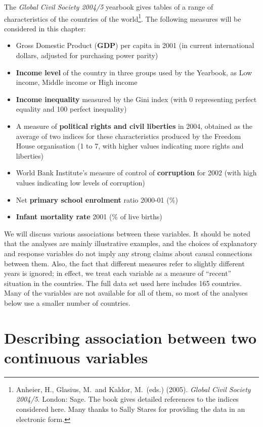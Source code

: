 The \emph{Global Civil Society 2004/5} yearbook gives tables of a range
of characteristics of the countries of the world\footnote { Anheier, H.,
Glasius, M.\ and Kaldor, M.\ (eds.) (2005). \emph{Global Civil Society
2004/5}. London: Sage. The book gives detailed references to the
indices considered here. Many thanks to Sally Stares for providing the
data in an electronic form.}. The following measures will be considered
in this chapter:
\begin{itemize}
\item
Gross Domestic Product (\textbf{GDP}) per capita in 2001
(in current international dollars,
adjusted for purchasing power parity)
\item
\textbf{Income level} of the country
in three groups used by the Yearbook, as
Low income, Middle income or High income
\item
\textbf{Income inequality} measured by the Gini index (with 0
representing perfect equality and 100 perfect inequality)
\item
A measure of \textbf{political rights and civil liberties} in 2004, obtained as
the average of two indices for these characteristics produced by the
Freedom House organisation (1 to 7, with higher values indicating more
rights and liberties)
\item
World Bank Institute's measure of control of \textbf{corruption} for 2002
(with high values indicating low levels of corruption)
\item
Net \textbf{primary school enrolment} ratio 2000-01 (\%)
\item
\textbf{Infant mortality rate} 2001 (\% of live births)
\end{itemize}
We will discuss various associations between these variables. It should
be noted that the analyses are mainly illustrative examples, and the
choices of explanatory and response variables do not imply any strong
claims about causal connections between them. Also, the fact that
different measures refer to slightly different years is ignored; in
effect, we treat each variable as a measure of ``recent'' situation in
the countries. The full data set used here includes  165 countries. Many
of the variables are not available for all of them, so most of the
analyses below use a smaller number of countries.

\section[Associations between continuous variables]
{Describing association between two continuous variables}
\label{s_regression_descr}

